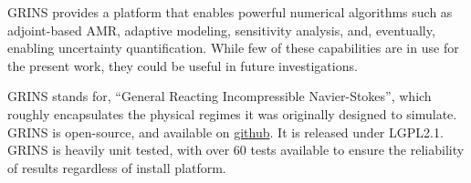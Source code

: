 GRINS provides a platform that enables powerful numerical algorithms
such as adjoint-based AMR, adaptive modeling, sensitivity analysis,
and, eventually, enabling uncertainty quantification. While few of these
capabilities are in use for the present work, they could be useful in
future investigations. 

GRINS stands for, ``General Reacting Incompressible Navier-Stokes'',
which roughly encapsulates the physical regimes it was originally
designed to simulate. GRINS is open-source, and available on
\hyperref[www.github.com/grinsfem/grins]{github}. It is released 
under LGPL2.1.  GRINS is heavily unit tested, with over 60 tests
available to ensure the reliability of results regardless of install
platform. 






%
%




